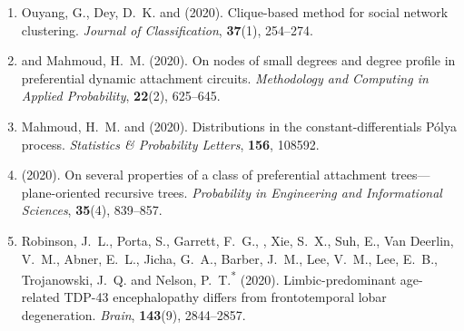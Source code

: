 \begin{enumerate}[resume=journalpubs]

\item\begin{pubentry} Ouyang, G., Dey, D.\ K. and \PZ{} (2020). Clique-based method for social network clustering. \emph{Journal of Classification}, \textbf{37}(1), 254--274.

\par\end{pubentry}
\item\begin{pubentry} \PZ{} and Mahmoud, H.\ M. (2020). On nodes of small degrees and degree profile in preferential dynamic attachment circuits. \emph{Methodology and Computing in Applied Probability}, \textbf{22}(2), 625--645.

\par\end{pubentry}
\item\begin{pubentry} Mahmoud, H.\ M. and \PZ{} (2020). Distributions in the constant-differentials P\'{o}lya process. \emph{Statistics \& Probability Letters}, \textbf{156}, 108592.

\par\end{pubentry}
\item\begin{pubentry} \PZ{} (2020). On several properties of a class of preferential attachment trees---plane-oriented recursive trees. \emph{Probability in Engineering and Informational Sciences}, \textbf{35}(4), 839--857.


\par\end{pubentry}
\item\begin{pubentry} Robinson, J.\ L., Porta, S., Garrett, F.\ G., \PZnot{}, Xie, S.\ X., Suh, E., Van Deerlin, V.\ M., Abner, E.\ L., Jicha, G.\ A., Barber, J.\ M., Lee, V.\ M., Lee, E.\ B., Trojanowski, J.\ Q. and Nelson, P.\ T.\textsuperscript{*} (2020). Limbic-predominant age-related TDP-43 encephalopathy differs from frontotemporal lobar degeneration. \emph{Brain}, \textbf{143}(9), 2844--2857.


\end{pubentry}
\end{enumerate}
